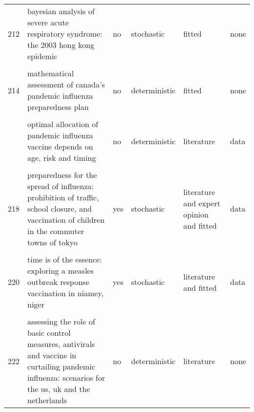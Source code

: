 \documentclass[
]{article}
\begin{document}
\begin{landscape}
\begin{longtable}{l>{\raggedright\arraybackslash}p{3cm}l>{\raggedright\arraybackslash}p{3cm}ll}
212 & bayesian analysis of severe acute respiratory syndrome: the 2003 hong kong epidemic & no & stochastic & fitted & none\\
\cellcolor{gray!6}{213} & \cellcolor{gray!6}{hepatitis b vaccination and changes in sexual risk behaviour among men who have sex with men in amsterdam} & \cellcolor{gray!6}{no} & \cellcolor{gray!6}{deterministic} & \cellcolor{gray!6}{literature and expert opinion} & \cellcolor{gray!6}{none}\\
214 & mathematical assessment of canada's pandemic influenza preparedness plan & no & deterministic & fitted & none\\
\cellcolor{gray!6}{215} & \cellcolor{gray!6}{modeling targeted layered containment of an influenza pandemic in the united states} & \cellcolor{gray!6}{yes} & \cellcolor{gray!6}{stochastic} & \cellcolor{gray!6}{literature and expert opinion} & \cellcolor{gray!6}{none}\\
\addlinespace
216 & optimal allocation of pandemic influenza vaccine depends on age, risk and timing & no & deterministic & literature & data\\
\cellcolor{gray!6}{217} & \cellcolor{gray!6}{pandemic simulation of antivirals plus school closures: buying time until strain-specific vaccine is available} & \cellcolor{gray!6}{no} & \cellcolor{gray!6}{deterministic} & \cellcolor{gray!6}{expert opinion} & \cellcolor{gray!6}{none}\\
218 & preparedness for the spread of influenza: prohibition of traffic, school closure, and vaccination of children in the commuter towns of tokyo & yes & stochastic & literature and expert opinion and fitted & data\\
\cellcolor{gray!6}{219} & \cellcolor{gray!6}{scenarios of diffusion and control of an influenza pandemic in italy} & \cellcolor{gray!6}{yes} & \cellcolor{gray!6}{both} & \cellcolor{gray!6}{literature and expert opinion and fitted} & \cellcolor{gray!6}{none}\\
220 & time is of the essence: exploring a measles outbreak response vaccination in niamey, niger & yes & stochastic & literature and fitted & data\\
\addlinespace
\cellcolor{gray!6}{221} & \cellcolor{gray!6}{a stochastic equation-based model of the value of international air-travel restrictions for controlling pandemic flu} & \cellcolor{gray!6}{yes} & \cellcolor{gray!6}{stochastic} & \cellcolor{gray!6}{literature} & \cellcolor{gray!6}{none}\\
222 & assessing the role of basic control measures, antivirals and vaccine in curtailing pandemic influenza: scenarios for the us, uk and the netherlands & no & deterministic & literature & none\\

\end{longtable}
\end{landscape}
\end{document}
